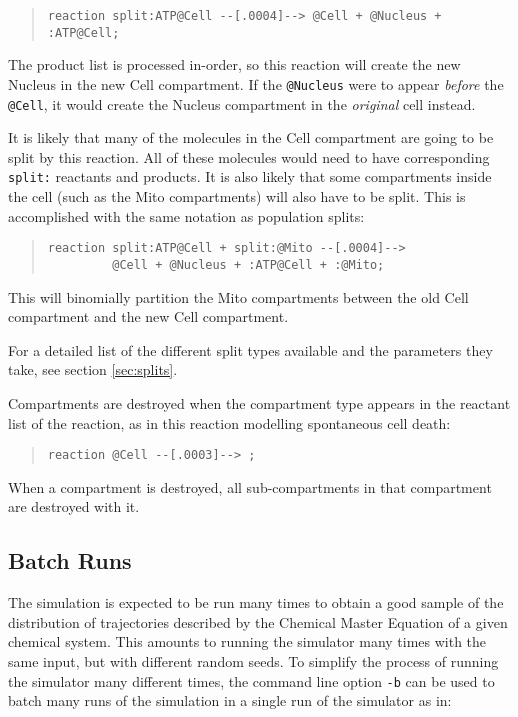 \documentclass[10pt]{article}
\newcommand{\code}[1]{{\tt {#1}}}
\begin{document}
\begin{quote}
\begin{verbatim}
reaction split:ATP@Cell --[.0004]--> @Cell + @Nucleus + :ATP@Cell;
\end{verbatim}
\end{quote}

The product list is processed in-order, so this reaction will create the new Nucleus in the new Cell compartment. If the \code{@Nucleus} were to appear \emph{before} the \code{@Cell}, it would create the Nucleus compartment in the \emph{original} cell instead.

It is likely that many of the molecules in the Cell compartment are going to be split by this reaction. All of these molecules would need to have corresponding \code{split:} reactants and products. It is also likely that some compartments inside the cell (such as the Mito compartments) will also have to be split. This is accomplished with the same notation as population splits:

\begin{quote}
\begin{verbatim}
reaction split:ATP@Cell + split:@Mito --[.0004]-->
         @Cell + @Nucleus + :ATP@Cell + :@Mito;
\end{verbatim}
\end{quote}

This will binomially partition the Mito compartments between the old Cell compartment and the new Cell compartment.

For a detailed list of the different split types available and the parameters they take, see section \ref{sec:splits}.

Compartments are destroyed when the compartment type appears in the reactant list of the reaction, as in this reaction modelling spontaneous cell death:

\begin{quote}
\begin{verbatim}
reaction @Cell --[.0003]--> ;
\end{verbatim}
\end{quote}

When a compartment is destroyed, all sub-compartments in that compartment are destroyed with it.

\subsection{Batch Runs}

The simulation is expected to be run many times to obtain a good sample of the distribution of trajectories described by the Chemical Master Equation of a given chemical system. This amounts to running the simulator many times with the same input, but with different random seeds. To simplify the process of running the simulator many different times, the command line option \code{-b} can be used to batch many runs of the simulation in a single run of the simulator as in:
\end{document}

